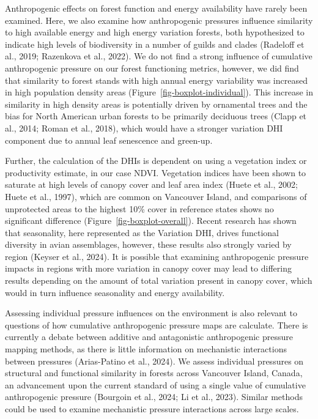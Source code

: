 \documentclass[
]{agujournal2019}
\begin{document}
Anthropogenic effects on forest function and energy availability have
rarely been examined. Here, we also examine how anthropogenic pressures
influence similarity to high available energy and high energy variation
forests, both hypothesized to indicate high levels of biodiversity in a
number of guilds and clades (Radeloff et al., 2019; Razenkova et al.,
2022). We do not find a strong influence of cumulative anthropogenic
pressure on our forest functioning metrics, however, we did find that
similarity to forest stands with high annual energy variability was
increased in high population density areas
(Figure~\ref{fig-boxplot-individual}). This increase in similarity in
high density areas is potentially driven by ornamental trees and the
bias for North American urban forests to be primarily deciduous trees
(Clapp et al., 2014; Roman et al., 2018), which would have a stronger
variation DHI component due to annual leaf senescence and green-up.

Further, the calculation of the DHIs is dependent on using a vegetation
index or productivity estimate, in our case NDVI. Vegetation indices
have been shown to saturate at high levels of canopy cover and leaf area
index (Huete et al., 2002; Huete et al., 1997), which are common on
Vancouver Island, and comparisons of unprotected areas to the highest
10\% cover in reference states shows no significant difference
(Figure~\ref{fig-boxplot-overall}). Recent research has shown that
seasonality, here represented as the Variation DHI, drives functional
diversity in avian assemblages, however, these results also strongly
varied by region (Keyser et al., 2024). It is possible that examining
anthropogenic pressure impacts in regions with more variation in canopy
cover may lead to differing results depending on the amount of total
variation present in canopy cover, which would in turn influence
seasonality and energy availability.

Assessing individual pressure influences on the environment is also
relevant to questions of how cumulative anthropogenic pressure maps are
calculate. There is currently a debate between additive and antagonistic
anthropogenic pressure mapping methods, as there is little information
on mechanistic interactions between pressures (Arias-Patino et al.,
2024). We assess individual pressures on structural and functional
similarity in forests across Vancouver Island, Canada, an advancement
upon the current standard of using a single value of cumulative
anthropogenic pressure (Bourgoin et al., 2024; Li et al., 2023). Similar
methods could be used to examine mechanistic pressure interactions
across large scales.
\end{document}
